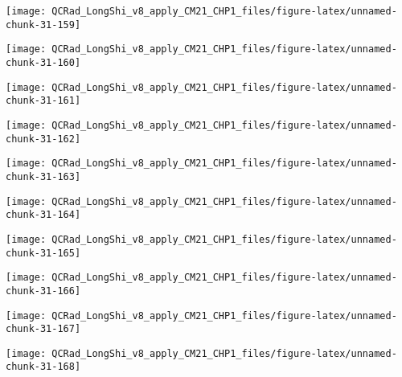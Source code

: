 \documentclass[
  10pt,
  a4paper,oneside]{article}
\begin{document}
\begin{center}\texttt{[image: QCRad\_LongShi\_v8\_apply\_CM21\_CHP1\_files/figure-latex/unnamed-chunk-31-159]} \end{center}

\begin{center}\texttt{[image: QCRad\_LongShi\_v8\_apply\_CM21\_CHP1\_files/figure-latex/unnamed-chunk-31-160]} \end{center}

\begin{center}\texttt{[image: QCRad\_LongShi\_v8\_apply\_CM21\_CHP1\_files/figure-latex/unnamed-chunk-31-161]} \end{center}

\begin{center}\texttt{[image: QCRad\_LongShi\_v8\_apply\_CM21\_CHP1\_files/figure-latex/unnamed-chunk-31-162]} \end{center}

\begin{center}\texttt{[image: QCRad\_LongShi\_v8\_apply\_CM21\_CHP1\_files/figure-latex/unnamed-chunk-31-163]} \end{center}

\begin{center}\texttt{[image: QCRad\_LongShi\_v8\_apply\_CM21\_CHP1\_files/figure-latex/unnamed-chunk-31-164]} \end{center}

\begin{center}\texttt{[image: QCRad\_LongShi\_v8\_apply\_CM21\_CHP1\_files/figure-latex/unnamed-chunk-31-165]} \end{center}

\begin{center}\texttt{[image: QCRad\_LongShi\_v8\_apply\_CM21\_CHP1\_files/figure-latex/unnamed-chunk-31-166]} \end{center}

\begin{center}\texttt{[image: QCRad\_LongShi\_v8\_apply\_CM21\_CHP1\_files/figure-latex/unnamed-chunk-31-167]} \end{center}

\begin{center}\texttt{[image: QCRad\_LongShi\_v8\_apply\_CM21\_CHP1\_files/figure-latex/unnamed-chunk-31-168]} \end{center}
\end{document}
